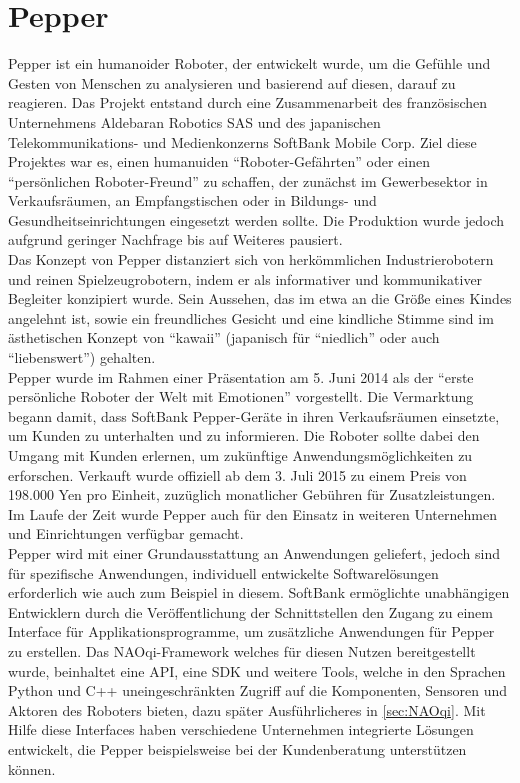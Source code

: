 \section{Pepper}\label{sec:Pepper}
Pepper ist ein humanoider Roboter, der entwickelt wurde, um die Gefühle und Gesten von Menschen zu analysieren und basierend auf diesen, darauf zu reagieren. Das Projekt entstand durch eine Zusammenarbeit des französischen Unternehmens Aldebaran Robotics \ac{SAS} und des japanischen Telekommunikations- und Medienkonzerns SoftBank Mobile Corp. Ziel diese Projektes war es, einen humanuiden ``Roboter-Gefährten'' oder einen ``persönlichen Roboter-Freund'' zu schaffen, der zunächst im Gewerbesektor in Verkaufsräumen, an Empfangstischen oder in Bildungs- und Gesundheitseinrichtungen eingesetzt werden sollte. Die Produktion wurde jedoch aufgrund geringer Nachfrage bis auf Weiteres pausiert.\\
Das Konzept von Pepper distanziert sich von herkömmlichen Industrierobotern und reinen Spielzeugrobotern, indem er als informativer und kommunikativer Begleiter konzipiert wurde. Sein Aussehen, das im etwa an die Größe eines Kindes angelehnt ist, sowie ein freundliches Gesicht und eine kindliche Stimme sind im ästhetischen Konzept von ``kawaii'' (japanisch für ``niedlich'' oder auch ``liebenswert'') gehalten.\\
Pepper wurde im Rahmen einer Präsentation am 5. Juni 2014 als der ``erste persönliche Roboter der Welt mit Emotionen'' vorgestellt. Die Vermarktung begann damit, dass SoftBank Pepper-Geräte in ihren Verkaufsräumen einsetzte, um Kunden zu unterhalten und zu informieren. Die Roboter sollte dabei den Umgang mit Kunden erlernen, um zukünftige Anwendungsmöglichkeiten zu erforschen. Verkauft wurde offiziell ab dem 3. Juli 2015 zu einem Preis von 198.000 Yen pro Einheit, zuzüglich monatlicher Gebühren für Zusatzleistungen. Im Laufe der Zeit wurde Pepper auch für den Einsatz in weiteren Unternehmen und Einrichtungen verfügbar gemacht.\\
Pepper wird mit einer Grundausstattung an Anwendungen geliefert, jedoch sind für spezifische Anwendungen, individuell entwickelte Softwarelösungen erforderlich wie auch zum Beispiel in diesem. SoftBank ermöglichte unabhängigen Entwicklern durch die Veröffentlichung der Schnittstellen den Zugang zu einem Interface für Applikationsprogramme, um zusätzliche Anwendungen für Pepper zu erstellen. Das NAOqi-Framework welches für diesen Nutzen bereitgestellt wurde, beinhaltet eine \ac{API}, eine \ac{SDK} und weitere Tools, welche in den Sprachen Python und C++ uneingeschränkten Zugriff auf die Komponenten, Sensoren und Aktoren des Roboters bieten, dazu später Ausführlicheres in \autoref{sec:NAOqi}. Mit Hilfe diese Interfaces haben verschiedene Unternehmen integrierte Lösungen entwickelt, die Pepper beispielsweise bei der Kundenberatung unterstützen können.\\
